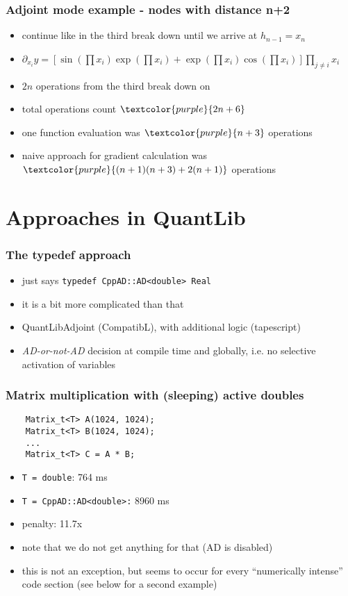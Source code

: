 \documentclass[10pt,German]{beamer}
\begin{document}
\begin{frame}[fragile]
\frametitle{Adjoint mode example - nodes with distance n+2}
\begin{itemize}
\item continue like in the third break down until we arrive at $h_{n-1} = x_n$
\item $\partial_{x_i} y = \left[\sin(\prod x_i)\exp(\prod x_i)+\exp(\prod x_i)\cos(\prod x_i)\right] \prod_{j\neq i} x_i$
\item $2n$ operations from the third break down on
\item total operations count $\textcolor{purple}{2n+6}$
\item one function evaluation was $\textcolor{purple}{n+3}$ operations
\item naive approach for gradient calculation was $\textcolor{purple}{(n+1)(n+3)+2(n+1)}$ operations
\end{itemize}
\end{frame}

\section{Approaches in QuantLib}

\begin{frame}[fragile]
\frametitle{The typedef approach}
\begin{itemize}
\item just says \verb+typedef CppAD::AD<double> Real+
\item it is a bit more complicated than that
\item QuantLibAdjoint (CompatibL), with additional logic (tapescript)
\item \textit{AD-or-not-AD} decision at compile time and globally, i.e. no selective activation of variables
\end{itemize}
\end{frame}

\begin{frame}[fragile]
\frametitle{Matrix multiplication with (sleeping) active doubles}
\begin{verbatim}
    Matrix_t<T> A(1024, 1024);
    Matrix_t<T> B(1024, 1024);
    ...
    Matrix_t<T> C = A * B;
\end{verbatim}
\begin{itemize}
\item \verb+T = double+: 764 ms
\item \verb+T = CppAD::AD<double>:+ 8960 ms
\item penalty: 11.7x
\item note that we do not get anything for that (AD is disabled)
\item this is not an exception, but seems to occur for every ``numerically intense'' code section (see below for a second example)
\end{itemize}
\end{frame}
\end{document}
